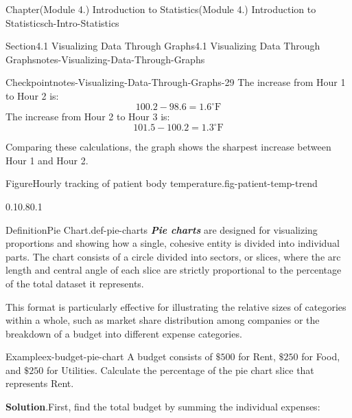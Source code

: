\documentclass[oneside,10pt,]{book}
\newcommand{\blocktitlefont}{\relax}
\newcommand{\alert}[1]{\textbf{\textit{#1}}}
\begin{document}
\begin{chapterptx}{Chapter}{(Module 4.) Introduction to Statistics}{}{(Module 4.) Introduction to Statistics}{}{}{ch-Intro-Statistics}
\begin{sectionptx}{Section}{4.1 Visualizing Data Through Graphs}{}{4.1 Visualizing Data Through Graphs}{}{}{notes-Visualizing-Data-Through-Graphs}
\begin{inlineexercise}{Checkpoint}{}{notes-Visualizing-Data-Through-Graphs-29}
The increase from Hour 1 to Hour 2 is:%
\begin{equation*}
100.2 - 98.6 = 1.6^\circ\text{F}
\end{equation*}
The increase from Hour 2 to Hour 3 is:%
\begin{equation*}
101.5 - 100.2 = 1.3^\circ\text{F}
\end{equation*}
%
\par
Comparing these calculations, the graph shows the sharpest increase between Hour 1 and Hour 2.%
\begin{figureptx}{Figure}{Hourly tracking of patient body temperature.}{fig-patient-temp-trend}{}%
\begin{image}{0.1}{0.8}{0.1}{}%
%
\end{image}%
\tcblower
\end{figureptx}%
\end{inlineexercise}%
\begin{definition}{Definition}{Pie Chart.}{def-pie-charts}%
\alert{Pie charts} are designed for visualizing proportions and showing how a single, cohesive entity is divided into individual parts. The chart consists of a circle divided into sectors, or slices, where the arc length and central angle of each slice are strictly proportional to the percentage of the total dataset it represents.%
\end{definition}
This format is particularly effective for illustrating the relative sizes of categories within a whole, such as market share distribution among companies or the breakdown of a budget into different expense categories.%
\begin{example}{Example}{}{ex-budget-pie-chart}%
A budget consists of \(\$500\) for Rent, \(\$250\) for Food, and \(\$250\) for Utilities. Calculate the percentage of the pie chart slice that represents Rent.%
\par\smallskip%
\noindent\textbf{\blocktitlefont Solution}.\hypertarget{ex-budget-pie-chart-2}{}\quad{}First, find the total budget by summing the individual expenses:%

\end{example}
\end{sectionptx}
\end{chapterptx}
\end{document}
